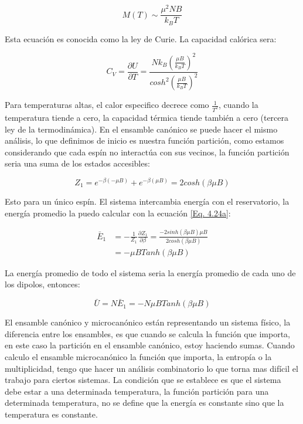\documentclass[11pt,fleqn]{book}
\begin{document}
\begin{equation}
    M(T)\sim\frac{\mu^{2}NB}{k_{B}T}
    \label{Eq. 4.23}
\end{equation}

Esta ecuación es conocida como la ley de Curie. La capacidad calórica sera:

\begin{equation}
    C_{V}=\frac{\partial U}{\partial T}=\frac{Nk_{B}(\frac{\mu B}{k_{B}T})^{2}}{cosh^{2}(\frac{\mu B}{k_{B}T})^{2}}
    \label{Eq. 4.24}
\end{equation}

Para temperaturas altas, el calor especifico decrece como $\frac{1}{T^{2}}$, cuando la temperatura tiende a cero, la capacidad térmica tiende también a cero (tercera ley de la termodinámica). En el ensamble canónico se puede hacer el mismo análisis, lo que definimos de inicio es nuestra función partición, como estamos considerando que cada espín no interactúa con sus vecinos, la función partición seria una suma de los estados accesibles:

\begin{equation}
    Z_{1}=e^{-\beta(-\mu B)}+e^{-\beta(\mu B)}=2cosh(\beta\mu B)
    \label{Eq. 4.24a}
\end{equation}

Esto para un único espín. El sistema intercambia energía con el reservatorio, la energía promedio la puedo calcular con la ecuación \ref{Eq. 4.24a}:

\begin{equation}
\begin{split}
        \bar{E}_{1}&=-\frac{1}{Z_{1}}\frac{\partial Z_{1}}{\partial\beta}=\frac{-2sinh(\beta\mu B)\mu B}{2cosh(\beta\mu B)}\\
        &=-\mu BTanh(\beta\mu B)
\end{split}
        \label{Eq. 4.25}
\end{equation}

La energía promedio de todo el sistema seria la energía promedio de cada uno de los dipolos, entonces:

\begin{equation}
 \bar{U}=N\bar{E}_{1}=-N\mu BTanh(\beta\mu B)
        \label{Eq. 4.26}
\end{equation}

El ensamble canónico y microcanónico están representando un sistema físico, la diferencia entre los ensambles, es que cuando se calcula la función que importa, en este caso la partición en el ensamble canónico, estoy haciendo sumas. Cuando calculo el ensamble microcanónico la función que importa, la entropía o la multiplicidad, tengo que hacer un análisis combinatorio lo que torna mas difícil el trabajo para ciertos sistemas. La condición que se establece es que el sistema debe estar a una determinada temperatura, la función partición para una determinada temperatura, no se define que la energía es constante sino que la temperatura es constante.
\end{document}
